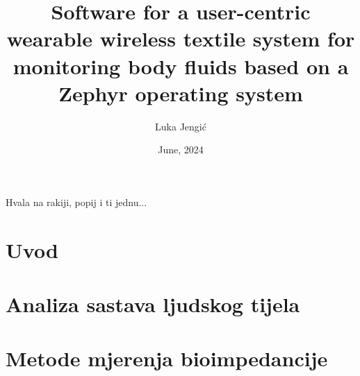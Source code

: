 \documentclass[diplomskirad, numeric, utf8, times]{fer}
\title{Software for a user-centric wearable wireless textile system for monitoring body fluids based on a Zephyr operating system}
\author{Luka Jengić}
\date{June, 2024}
\begin{document}
\maketitle






\begin{zahvale}
  Hvala na rakiji, popij i ti jednu...
\end{zahvale}


\mainmatter


\tableofcontents


\chapter{Uvod}
\label{pog:uvod}



\chapter{Analiza sastava ljudskog tijela}
\label{pog:glavni_dio}



\chapter{Metode mjerenja bioimpedancije}
\label{chap:bioz}



\end{document}
